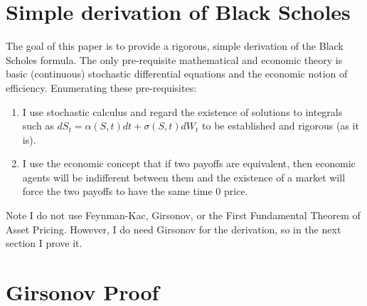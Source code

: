 \documentclass{article}
\begin{document}
\section{Simple derivation of Black Scholes}

The goal of this paper is to provide a rigorous, simple derivation of the Black Scholes formula.  The only pre-requisite mathematical and economic theory is basic (continuous) stochastic differential equations and the economic notion of efficiency.  Enumerating these pre-requisites:
\begin{enumerate}
	\item I use stochastic calculus and regard the existence of solutions to integrals such as \(dS_t=\alpha(S, t)dt+\sigma(S, t)dW_t\) to be established and rigorous (as it is).
	\item I use the economic concept that if two payoffs are equivalent, then economic agents will be indifferent between them and the existence of a market will force the two payoffs to have the same time \(0\) price.
\end{enumerate}

Note I do not use Feynman-Kac, Girsonov, or the First Fundamental Theorem of Asset Pricing.  However, I do need Girsonov for the derivation, so in the next section I prove it.

\section{Girsonov Proof}
\end{document}
